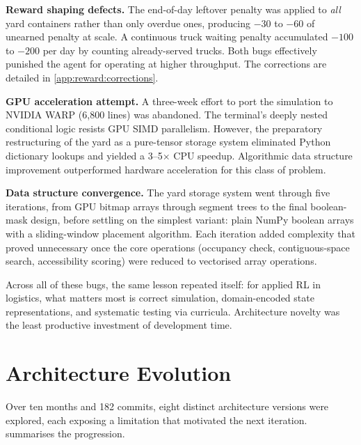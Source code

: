 \textbf{Reward shaping defects.} The end-of-day leftover penalty was applied to \emph{all} yard containers rather than only overdue ones, producing $-30$ to $-60$ of unearned penalty at scale. A continuous truck waiting penalty accumulated $-100$ to $-200$ per day by counting already-served trucks. Both bugs effectively punished the agent for operating at higher throughput. The corrections are detailed in \cref{app:reward:corrections}.

\textbf{GPU acceleration attempt.} A three-week effort to port the simulation to NVIDIA WARP (6,800 lines) was abandoned. The terminal's deeply nested conditional logic resists GPU SIMD parallelism. However, the preparatory restructuring of the yard as a pure-tensor storage system eliminated Python dictionary lookups and yielded a 3--5$\times$ CPU speedup. Algorithmic data structure improvement outperformed hardware acceleration for this class of problem.

\textbf{Data structure convergence.} The yard storage system went through five iterations, from GPU bitmap arrays through segment trees to the final boolean-mask design, before settling on the simplest variant: plain NumPy boolean arrays with a sliding-window placement algorithm. Each iteration added complexity that proved unnecessary once the core operations (occupancy check, contiguous-space search, accessibility scoring) were reduced to vectorised array operations.

Across all of these bugs, the same lesson repeated itself: for applied RL in logistics, what matters most is correct simulation, domain-encoded state representations, and systematic testing via curricula. Architecture novelty was the least productive investment of development time.

\section{Architecture Evolution}
\label{sec:disc:architecture_evolution}

Over ten months and 182 commits, eight distinct architecture versions were explored, each exposing a limitation that motivated the next iteration.  summarises the progression.


